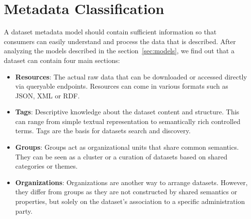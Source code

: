 \documentclass[runningheads,a4paper]{../../Tools/LaTEX/llncs}
\begin{document}
\section{Metadata Classification}
\label{sec:metadata}
A dataset metadata model should contain sufficient information so that consumers can easily understand and process the data that is described. After analyzing the models described in the section~\ref{sec:models}, we find out that a dataset can contain four main sections:
\begin{itemize}
  \item \textbf{Resources}: The actual raw data that can be downloaded or accessed directly via queryable endpoints. Resources can come in various formats such as JSON, XML or RDF.
  \item \textbf{Tags}: Descriptive knowledge about the dataset content and structure. This can range from simple textual representation to semantically rich controlled terms. Tags are the basis for datasets search and discovery.
  \item \textbf{Groups}: Groups act as organizational units that share common semantics. They can be seen as a cluster or a curation of datasets based on shared categories or themes.
  \item \textbf{Organizations}: Organizations are another way to arrange datasets. However, they differ from groups as they are not constructed by shared semantics or properties, but solely on the dataset's association to a specific administration party.
\end{itemize}
\end{document}
